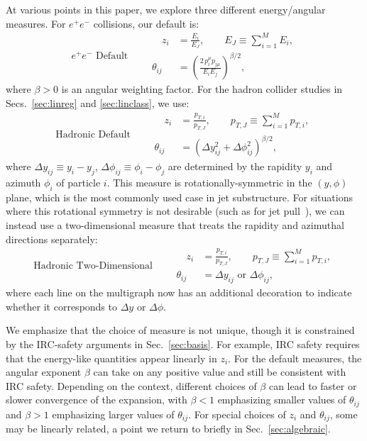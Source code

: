 \documentclass[letterpaper,11pt]{article}
\DeclareRobustCommand{\Sec}[1]{Sec.~\ref{#1}}
\DeclareRobustCommand{\Secs}[2]{Secs.~\ref{#1} and \ref{#2}}
\newcommand{\B}{\text{EFP}\xspace}
\newcommand{\Bs}{\text{EFPs}\xspace}
\begin{document}
At various points in this paper, we explore three different energy/angular measures.  For $e^+e^-$ collisions, our default is:
\begin{equation}\label{eq:eemeasure}
\boxed{\text{$e^+e^-$ Default}} \qquad
\begin{aligned}
\quad z_i &= \frac{E_i}{E_J}, \qquad  E_J\equiv\sum_{i=1}^M E_i, \\
\theta_{ij} &= \left(\frac{2\,p_i^\mu p_{j\mu}}{E_i  E_j} \right)^{\beta/2},
\end{aligned}
\end{equation}
where $\beta>0$ is an angular weighting factor. 
%
For the hadron collider studies in \Secs{sec:linreg}{sec:linclass}, we use:
\begin{equation}\label{eq:hadronicmeasure}
\boxed{\text{Hadronic Default}} \qquad
\begin{aligned}
\quad z_i &= \frac{p_{T,i}}{p_{T,J}}, \qquad  p_{T,J}\equiv\sum_{i=1}^Mp_{T,i}, \\
\theta_{ij} &= \left(\Delta y_{ij}^2+\Delta\phi_{ij}^2\right)^{\beta/2},
\end{aligned}
\end{equation}
where $\Delta y_{ij}\equiv y_i-y_j$, $\Delta\phi_{ij}\equiv\phi_i-\phi_j$ are determined by the rapidity $y_i$ and azimuth $\phi_i$ of particle $i$.
%
This measure is rotationally-symmetric in the $(y,\phi)$ plane, which is the most commonly used case in jet substructure.
%
For situations where this rotational symmetry is not desirable (such as for jet pull~\cite{Gallicchio:2010sw}), we can instead use a two-dimensional measure that treats the rapidity and azimuthal directions separately:
\begin{equation}\label{eq:2Dhadronicmeasure}
\boxed{\text{Hadronic Two-Dimensional}} \qquad
\begin{aligned}
\quad z_i &= \frac{p_{T,i}}{p_{T,J}}, \qquad  p_{T,J}\equiv\sum_{i=1}^Mp_{T,i}, \\
\theta_{ij} &= \Delta y_{ij} \text{ or } \Delta\phi_{ij},
\end{aligned}
\end{equation}
where each line on the multigraph now has an additional decoration to indicate whether it corresponds to $\Delta y$ or $\Delta \phi$.

We emphasize that the choice of measure is not unique, though it is constrained by the IRC-safety arguments in \Sec{sec:basis}.
%
For example, IRC safety requires that the energy-like quantities appear linearly in $z_i$.
%
For the default measures, the angular exponent $\beta$ can take on any positive value and still be consistent with IRC safety.
%
Depending on the context, different choices of $\beta$ can lead to faster or slower convergence of the \B expansion, with $\beta<1$ emphasizing smaller values of $\theta_{ij}$ and $\beta>1$ emphasizing larger values of $\theta_{ij}$.
%
For special choices of $z_i$ and $\theta_{ij}$, some \Bs may be linearly related, a point we return to briefly in \Sec{sec:algebraic}.  
\end{document}
